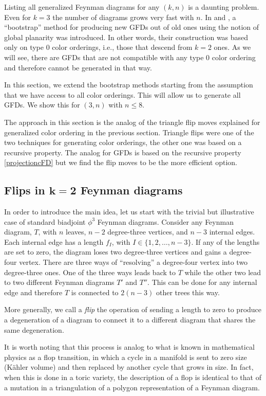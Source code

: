 \documentclass[pdftex]{sigma}
\theoremstyle{definition}
\numberwithin{equation}{section}
\begin{document}
Listing all generalized Feynman diagrams for any $(k,n)$ is a daunting problem. Even for $k=3$ the number of diagrams grows very fast with $n$. In \cite{Borges:2019csl} and \cite{Cachazo:2019xjx}, a ``bootstrap'' method for producing new GFDs out of old ones using the notion of global planarity was introduced. In other words, their construction was based only on type 0 color orderings, i.e., those that descend from $k=2$ ones. As we will see, there are GFDs that are not compatible with any type 0 color ordering and therefore cannot be generated in that way.

In this section, we extend the bootstrap methods starting from the assumption that we have access to all color orderings. This will allow us to generate all GFDs. We show this for $(3,n)$ with $n\leq 8$.

The approach in this section is the analog of the triangle flip moves explained for generalized color ordering in the previous section. Triangle flips were one of the two techniques for generating color orderings, the other one was based on a recursive property. The analog for GFDs is based on the recursive property \eqref{projectioncFD} but we find the flip moves to be the more efficient option.

\subsection[Flips in k=2 Feynman diagrams]{Flips in $\boldsymbol{k=2}$ Feynman diagrams}

In order to introduce the main idea, let us start with the trivial but illustrative case of standard biadjoint $\phi^3$ Feynman diagrams.
Consider any Feynman diagram, $T$, with $n$ leaves, $n-2$ degree-three vertices, and $n-3$ internal edges. Each internal edge has a length $f_I$, with $I\in \{1,2,\dots ,n-3\}$. If any of the lengths are set to zero, the diagram loses two degree-three vertices and gains a degree-four vertex. There are three ways of ``resolving'' a degree-four vertex into two degree-three ones. One of the three ways leads back to $T$ while the other two lead to two different Feynman diagrams $T'$ and $T''$. This can be done for any internal edge and therefore $T$ is connected to $2(n-3)$ other trees this way.

More generally, we call a {\it flip} the operation of sending a length to zero to produce a degeneration of a diagram to connect it to a different diagram that shares the same degeneration.

It is worth noting that this process is analog to what is known in mathematical physics as a flop transition, in which a cycle in a manifold is sent to zero size (K\"ahler volume) and then replaced by another cycle that grows in size. In fact, when this is done in a toric variety, the description of a flop is identical to that of a mutation in a triangulation of a polygon representation of a Feynman diagram.
\end{document}
